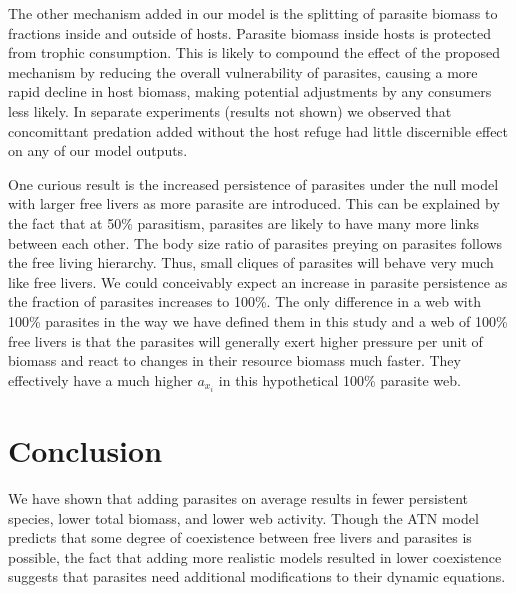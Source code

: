 \documentclass[/home/nkappler/Research/Dissertation/dissertation.tex]{subfiles}
\begin{document}
\begin{bibunit}
The other mechanism added in our model is the splitting of parasite biomass to
fractions inside and outside of hosts. Parasite biomass inside hosts is
protected from trophic consumption. This is likely to compound the effect of
the proposed mechanism by reducing the overall vulnerability of parasites,
causing a more rapid decline in host biomass, making potential adjustments by
any consumers less likely. In separate experiments (results not shown) we
observed that concomittant predation added without the host refuge had little
discernible effect on any of our model outputs.

One curious result is the increased persistence of parasites under the null
model with larger free livers as more parasite are introduced. This can be
explained by the fact that at 50\% parasitism, parasites are likely to have
many more links between each other. The body size ratio of parasites preying on
parasites follows the free living hierarchy. Thus, small cliques of parasites
will behave very much like free livers. We could conceivably expect an increase
in parasite persistence as the fraction of parasites increases to 100\%. The
only difference in a web with 100\% parasites in the way we have defined them
in this study and a web of 100\% free livers is that the parasites will
generally exert higher pressure per unit of biomass and react to changes in
their resource biomass much faster. They effectively have a much higher
$a_{x_i}$ in this hypothetical 100\% parasite web.

\section{Conclusion}

We have shown that adding parasites on average results in fewer persistent
species, lower total biomass, and lower web activity. Though the ATN model
predicts that some degree of coexistence between free livers and parasites is
possible, the fact that adding more realistic models resulted in lower
coexistence suggests that parasites need additional modifications to their
dynamic equations.

\putbib
\end{bibunit}
\end{document}
